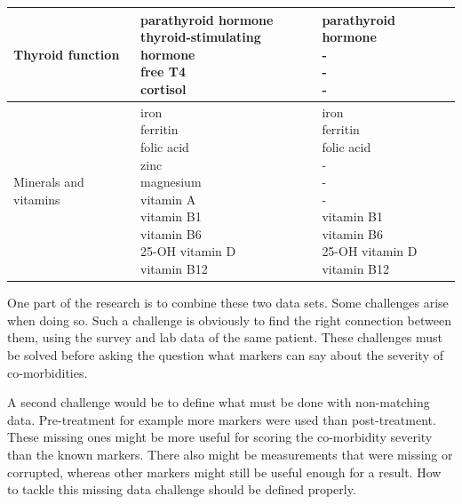 \documentclass[10pt,a4paper]{report}
\begin{document}
\begin{table}
\begin{tabular}{lll}
			Thyroid function      & \makecell{parathyroid hormone\\thyroid-stimulating hormone\\free T4\\cortisol}                                                                                 & \makecell{parathyroid hormone\\-\\-\\-}                                                                                                                        \\ \hline
			Minerals and vitamins & \makecell{iron\\ferritin\\folic acid\\zinc\\magnesium\\vitamin A\\vitamin B1\\vitamin B6\\25-OH vitamin D\\vitamin B12}                                        & \makecell{iron\\ferritin\\folic acid\\-\\-\\-\\vitamin B1\\vitamin B6\\25-OH vitamin D\\vitamin B12}                                                           \\ \hline
		\end{tabular}
	\end{table}
	
	One part of the research is to combine these two data sets. Some challenges arise when doing so. Such a challenge is obviously to find the right connection between them, using the survey and lab data of the same patient. These challenges must be solved before asking the question what markers can say about the severity of co-morbidities.
	
	A second challenge would be to define what must be done with non-matching data. Pre-treatment for example more markers were used than post-treatment. These missing ones might be more useful for scoring the co-morbidity severity than the known markers. There also might be measurements that were missing or corrupted, whereas other markers might still be useful enough for a result. How to tackle this missing data challenge should be defined properly.
	
\end{document}
